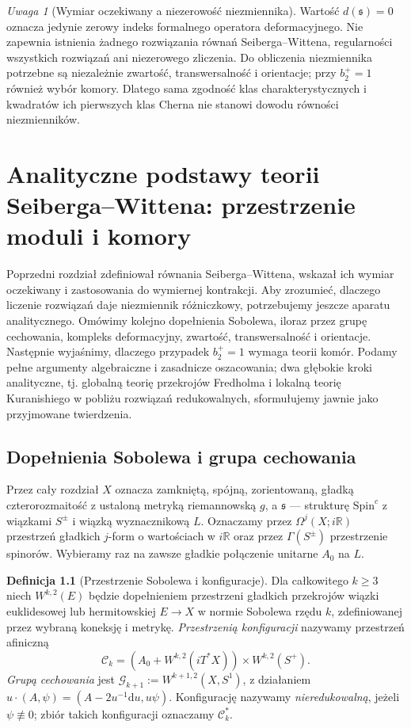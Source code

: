 \documentclass[11pt,a4paper]{report}
\numberwithin{equation}{section}
\theoremstyle{plain}
\theoremstyle{definition}
\newtheorem{definicja}[twierdzenie]{Definicja}
\theoremstyle{remark}
\newtheorem{uwaga}[twierdzenie]{Uwaga}
\begin{document}
\begin{uwaga}[Wymiar oczekiwany a niezerowość niezmiennika]
Wartość $d(\mathfrak s)=0$ oznacza jedynie zerowy indeks
formalnego operatora deformacyjnego. Nie zapewnia istnienia
żadnego rozwiązania równań Seiberga--Wittena, regularności
wszystkich rozwiązań ani niezerowego zliczenia.
Do obliczenia niezmiennika potrzebne są niezależnie
zwartość, transwersalność i orientacje; przy $b_2^+=1$
również wybór komory. Dlatego sama zgodność klas
charakterystycznych i kwadratów ich pierwszych klas
Cherna nie stanowi dowodu równości niezmienników.
\end{uwaga}

\chapter{Analityczne podstawy teorii Seiberga--Wittena: przestrzenie moduli i komory}
\label{ch:tg-sw-analiza}

Poprzedni rozdział zdefiniował równania Seiberga--Wittena, wskazał ich
wymiar oczekiwany i zastosowania do wymiernej kontrakcji. Aby zrozumieć,
dlaczego liczenie rozwiązań daje niezmiennik różniczkowy, potrzebujemy
jeszcze aparatu analitycznego. Omówimy kolejno dopełnienia Sobolewa,
iloraz przez grupę cechowania, kompleks deformacyjny, zwartość,
transwersalność i orientacje. Następnie wyjaśnimy, dlaczego przypadek
$b_2^+=1$ wymaga teorii komór. Podamy pełne argumenty algebraiczne
i zasadnicze oszacowania; dwa głębokie kroki analityczne, tj. globalną
teorię przekrojów Fredholma i lokalną teorię Kuranishiego w pobliżu
rozwiązań redukowalnych, sformułujemy jawnie jako przyjmowane twierdzenia.

\section{Dopełnienia Sobolewa i grupa cechowania}
\label{sec:tg-sw-sobolev}

Przez cały rozdział $X$ oznacza zamkniętą, spójną, zorientowaną,
gładką czterorozmaitość z ustaloną metryką riemannowską $g$,
a $\mathfrak s$ --- strukturę $\mathrm{Spin}^c$ z wiązkami $S^\pm$
i wiązką wyznacznikową $L$. Oznaczamy przez
$\Omega^j(X;i\mathbb R)$ przestrzeń gładkich $j$-form o wartościach
w $i\mathbb R$ oraz przez $\Gamma(S^\pm)$ przestrzenie spinorów.
Wybieramy raz na zawsze gładkie połączenie unitarne $A_0$ na $L$.

\begin{definicja}[Przestrzenie Sobolewa i konfiguracje]
Dla całkowitego $k\geq3$ niech $W^{k,2}(E)$ będzie dopełnieniem
przestrzeni gładkich przekrojów wiązki euklidesowej lub hermitowskiej
$E\to X$ w normie Sobolewa rzędu $k$, zdefiniowanej przez
wybraną koneksję i metrykę. \emph{Przestrzenią konfiguracji} nazywamy
przestrzeń afiniczną
\[
\mathcal C_k=(A_0+W^{k,2}(iT^*X))\times W^{k,2}(S^+).
\]
\emph{Grupą cechowania} jest $\mathcal G_{k+1}:=W^{k+1,2}(X,S^1)$,
z działaniem $u\cdot(A,\psi)=(A-2u^{-1}\mathrm du,u\psi)$.
Konfigurację nazywamy \emph{nieredukowalną}, jeżeli
$\psi\not\equiv0$; zbiór takich konfiguracji oznaczamy
$\mathcal C_k^*$.
\end{definicja}
\end{document}
